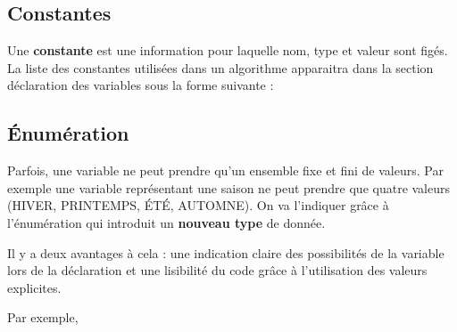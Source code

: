 
		\subsection{Constantes}

			Une \textbf{constante} est une information pour laquelle nom, type et
			valeur sont figés. La liste des constantes utilisées dans un algorithme
			apparaitra dans la section déclaration des variables sous la forme
			suivante :



		\subsection{Énumération}

			Parfois, une variable ne peut prendre qu'un ensemble
			fixe et fini de valeurs. Par exemple une variable représentant une
			saison ne peut prendre que quatre valeurs (HIVER, PRINTEMPS, ÉTÉ,
			AUTOMNE). On va l'indiquer grâce à
			l'énumération qui introduit un \textbf{nouveau type}
			de donnée.


			Il y a deux avantages à cela : une indication claire des possibilités de
			la variable lors de la déclaration et une lisibilité du code grâce à
			l'utilisation des valeurs explicites.
			
			Par exemple, 
			


